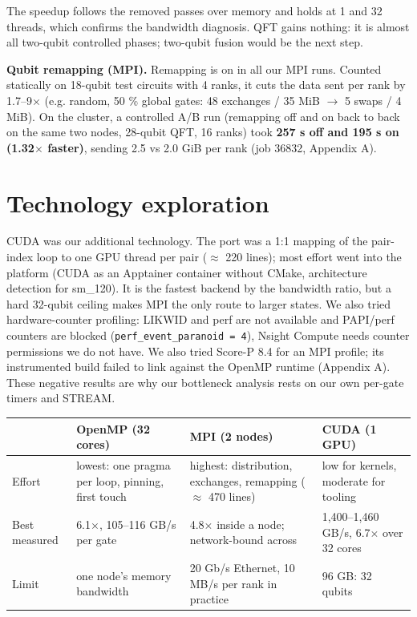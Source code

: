 \documentclass[10pt,a4paper]{article}
\begin{document}
The speedup follows the removed passes over memory and holds at 1 and 32 threads, which confirms the bandwidth diagnosis. QFT gains nothing: it is almost all two-qubit controlled phases; two-qubit fusion would be the next step.



\textbf{Qubit remapping (MPI).} Remapping is on in all our MPI runs. Counted statically on 18-qubit test circuits with 4 ranks, it cuts the data sent per rank by 1.7--9$\times$ (e.g. random, 50 \% global gates: 48 exchanges / 35 MiB $\rightarrow$ 5 swaps / 4 MiB). On the cluster, a controlled A/B run (remapping off and on back to back on the same two nodes, 28-qubit QFT, 16 ranks) took \textbf{257 s off and 195 s on (1.32$\times$ faster)}, sending 2.5 vs 2.0 GiB per rank (job 36832, Appendix A).



\section{Technology exploration}



CUDA was our additional technology. The port was a 1:1 mapping of the pair-index loop to one GPU thread per pair ($\approx$ 220 lines); most effort went into the platform (CUDA as an Apptainer container without CMake, architecture detection for sm\_120). It is the fastest backend by the bandwidth ratio, but a hard 32-qubit ceiling makes MPI the only route to larger states. We also tried hardware-counter profiling: LIKWID and perf are not available and PAPI/perf counters are blocked (\texttt{perf\_event\_paranoid = 4}), Nsight Compute needs counter permissions we do not have. We also tried Score-P 8.4 for an MPI profile; its instrumented build failed to link against the OpenMP runtime (Appendix A). These negative results are why our bottleneck analysis rests on our own per-gate timers and STREAM.



\begin{table}[ht]\centering\small
\begin{tabularx}{\linewidth}{@{}XllX@{}}
\toprule
\textbf{} & \textbf{OpenMP (32 cores)} & \textbf{MPI (2 nodes)} & \textbf{CUDA (1 GPU)} \\
\midrule
Effort & lowest: one pragma per loop, pinning, first touch & highest: distribution, exchanges, remapping ($\approx$ 470 lines) & low for kernels, moderate for tooling \\
Best measured & 6.1$\times$, 105--116 GB/s per gate & 4.8$\times$ inside a node; network-bound across & 1,400--1,460 GB/s, 6.7$\times$ over 32 cores \\
Limit & one node's memory bandwidth & 20 Gb/s Ethernet, 10 MB/s per rank in practice & 96 GB: 32 qubits \\
\bottomrule
\end{tabularx}
\end{table}
\end{document}
